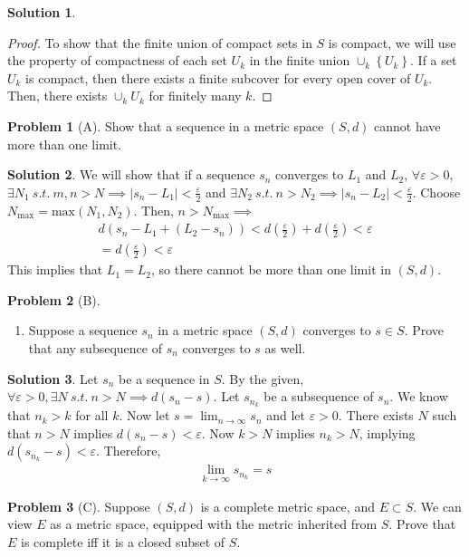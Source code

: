 \documentclass[12pt]{article}
\theoremstyle{definition} %
\newtheorem{solution}{Solution}
\newtheorem{problem}{Problem}
\theoremstyle{plain} %
\begin{document}
\begin{solution}
   \begin{proof}
    To show that the finite union of compact sets in $S$ is compact, we will use the property of compactness of each set $U_k$ in the finite union $\cup_k \left\{  U_k\right\} $. 
    If a set $U_k$ is compact, then there exists a finite subcover for every open cover of $U_k$. Then, there exists $\cup_k U_k$ for finitely many $k$.
   \end{proof} 
\end{solution}

\begin{problem}[A]
    Show that a sequence in a metric space $(S,d)$ cannot have more than one limit.
\end{problem}

\begin{solution}
   We will show that if a sequence $s_{n} $ converges to $L_{1} $ and $L_{2} $, $\forall \varepsilon >0$, $\exists N_{1}\ s.t. \ m,n >N \implies \left\vert s_{n} -L_{1}   \right\vert <\frac{\varepsilon}{2}$ and $\exists N_{2} \ s.t. \ n>N_{2} \implies \left\vert s_{n} -L_{2}  \right\vert <\frac{\varepsilon}{2}$. Choose $N_{\text{max} }=\text{max}(N_{1},N_{2} )  $. Then, $n>N_{\text{max} } \implies $
   \begin{align}
    d\left( s_{n}  -L_{1}  + (L_{2}-s_{n}) \right)  <  d\left( \frac{\varepsilon}{2} \right)  +  d\left( \frac{\varepsilon}{2} \right)< \varepsilon \\[10pt] 
   =  d\left( \frac{\varepsilon}{2} \right) <\varepsilon 
   \end{align}
   This implies that $L_{1} =L_{2} $, so there cannot be more than one limit in $(S,d)$. 
\end{solution}

\begin{problem}[B]
    \begin{enumerate}
        \item Suppose a sequence $s_{n} $ in a metric space $(S,d)$ converges to $s\in S$. Prove that any subsequence of $s_{n} $ converges to $s$ as well.
    \end{enumerate}
\end{problem}

\begin{solution}
    Let $s_{n} $ be a sequence in $S$. By the given, $\forall \varepsilon >0,\exists N\ s.t. \ n>N\implies d(s_{n}-s)$. Let $s_{n_{k}} $ be a subsequence of $s_{n} $. We know that $n_{k} >k$ for all $k$. 
    Now let $s=\lim_{n \to \infty} s_{n} $ and let $\varepsilon >0$. There exists $N$ such that $n>N$ implies $d(s_{n} -s)<\varepsilon $. Now $k>N$ implies $n_{k} >N$, implying $d(s_{n_{k} }-s )<\varepsilon $. Therefore,
    \begin{align}
        \lim_{k \to \infty} s_{n_{k} }=s 
    \end{align}   
\end{solution}
\begin{problem}[C]
    Suppose $(S,d)$ is a complete metric space, and $E \subset S$. We can view $E$ as a metric space, equipped with the metric inherited from $S$. Prove that $E$ is complete iff it is a closed subset of $S$. 
\end{problem}
\end{document}
